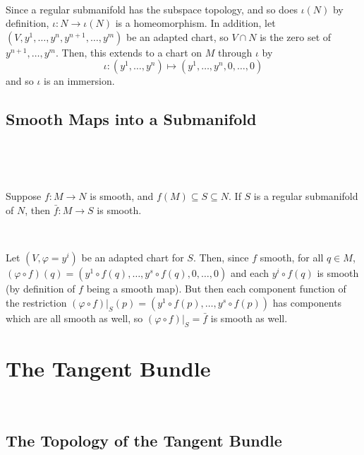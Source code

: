 \documentclass{article}
\begin{document}
\begin{customproof}
  \

  Since a regular submanifold has the subspace topology, and so does $\iota(N)$ by definition, $\iota: N \to \iota(N)$ is a homeomorphism. In addition, let $(V, y^1, \dots, y^n, y^{n+1}, \dots, y^m)$ be an adapted chart, so $V \cap N$ is the zero set of $y^{n+1}, \dots, y^m$. Then, this extends to a chart on $M$ through $\iota$ by $$\iota: (y^1,\dots, y^n) \mapsto (y^1, \dots, y^n, 0, \dots, 0)$$and so $\iota$ is an immersion.
\end{customproof}

\subsection{Smooth Maps into a Submanifold}
\

\begin{theorem}
  \

  Suppose $f: M\to N$ is smooth, and $f(M) \subseteq S \subseteq N$. If $S$ is a regular submanifold of $N$, then $\bar{f}: M \to S$ is smooth.
\end{theorem}

\begin{customproof}
  \

  Let $(V, \varphi= y^i)$ be an adapted chart for $S$. Then, since $f$ smooth, for all $q \in M$, $(\varphi \circ f)(q) = (y^1 \circ f(q), \dots, y^s \circ f(q), 0, \dots, 0)$ and each $y^i \circ f(q)$ is smooth (by definition of $f$ being a smooth map). But then each component function of the restriction $(\varphi \circ f) \vert_S(p) = (y^1 \circ f(p), \dots, y^s \circ f(p))$ has components which are all smooth as well, so $(\varphi \circ f) \vert_S = \bar{f}$ is smooth as well.
\end{customproof}

\section{The Tangent Bundle}
\

\subsection{The Topology of the Tangent Bundle}
\
\end{document}
